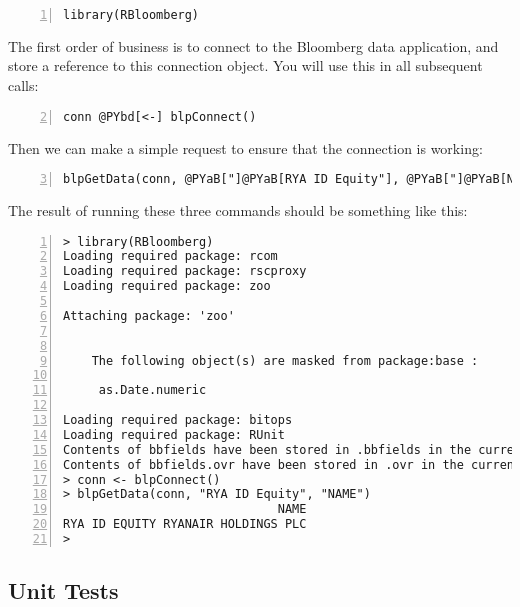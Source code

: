 \documentclass[a4paper]{article}
\begin{document}
\begin{Verbatim}[commandchars=@\[\],numbers=left,firstnumber=1,stepnumber=1]
library(RBloomberg)
\end{Verbatim}

    

The first order of business is to connect to the Bloomberg data application, and store a reference to this connection object. You will use this in all subsequent calls:

\begin{Verbatim}[commandchars=@\[\],numbers=left,firstnumber=2,stepnumber=1]
conn @PYbd[<-] blpConnect()
\end{Verbatim}

    

Then we can make a simple request to ensure that the connection is working:

\begin{Verbatim}[commandchars=@\[\],numbers=left,firstnumber=3,stepnumber=1]
blpGetData(conn, @PYaB["]@PYaB[RYA ID Equity"], @PYaB["]@PYaB[NAME"])
\end{Verbatim}

    

The result of running these three commands should be something like this:

\begin{Verbatim}[commandchars=@\[\],numbers=left,firstnumber=1,stepnumber=1]
> library(RBloomberg)
Loading required package: rcom
Loading required package: rscproxy
Loading required package: zoo

Attaching package: 'zoo'


	The following object(s) are masked from package:base :

	 as.Date.numeric 

Loading required package: bitops
Loading required package: RUnit
Contents of bbfields have been stored in .bbfields in the current workspace
Contents of bbfields.ovr have been stored in .ovr in the current workspace
> conn <- blpConnect()
> blpGetData(conn, "RYA ID Equity", "NAME")
                              NAME
RYA ID EQUITY RYANAIR HOLDINGS PLC
> 
\end{Verbatim}

    


\subsection{Unit Tests} %
\label{sub:unit_tests}
\end{document}
